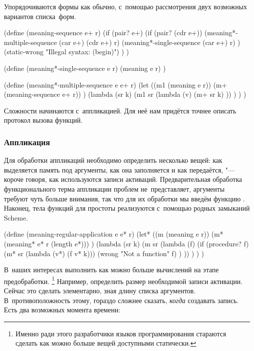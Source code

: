 Упорядочиваются формы как обычно, с~помощью рассмотрения двух возможных
вариантов списка~форм.

\begin{code:lisp}
(define (meaning-sequence e+ r)
  (if (pair? e+)
      (if (pair? (cdr e+))
          (meaning*-multiple-sequence (car e+) (cdr e+) r)
          (meaning*-single-sequence (car e+) r) )
      (static-wrong "Illegal syntax: (begin)") ) )

(define (meaning*-single-sequence e r)
  (meaning e r) )

(define (meaning*-multiple-sequence e e+ r)
  (let ((m1 (meaning e r))
        (m+ (meaning-sequence e+ r)) )
    (lambda (sr k)
      (m1 sr (lambda (v)
               (m+ sr k) )) ) ) )
\end{code:lisp}

Сложности начинаются с~аппликацией. Для неё нам придётся точнее описать протокол
вызова функций.


\subsubsection{Аппликация}\label{fast/fast/begin/ssect:application}

Для обработки аппликаций необходимо определить несколько вещей: как выделяется
память под аргументы, как она заполняется и как передаётся, "--- короче говоря,
как используются записи активаций. Предварительная обработка функционального
терма аппликации проблем не~представляет, аргументы требуют чуть больше
внимания, так что для их обработки мы введём функцию . Наконец,
тела функций для простоты реализуются с~помощью родных замыканий Scheme.

\begin{code:lisp}
(define (meaning-regular-application e e* r)
  (let* ((m (meaning e r))
         (m* (meaning* e* r (length e*))) )
    (lambda (sr k)
      (m sr (lambda (f)
              (if (procedure? f)
                  (m* sr (lambda (v*) (f v* k)))
                  (wrong "Not a function" f) ) )) ) ) )
\end{code:lisp}


В~наших интересах выполнить как можно больше вычислений на этапе предобработки.%
\footnote*{Именно ради этого разработчики языков программирования стараются
сделать как можно больше вещей доступными статически.} Например, определить
размер необходимой записи активации. Сейчас это сделать элементарно, зная длину
списка аргументов. В~противоположность этому, гораздо сложнее сказать,
\emph{когда} создавать запись. Есть два возможных момента времени:

